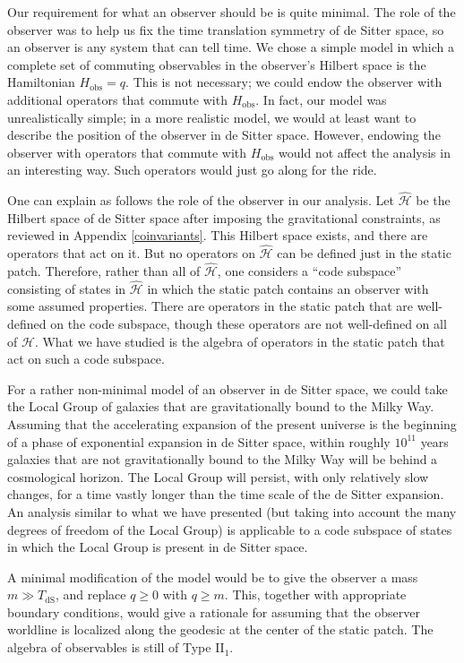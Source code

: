 \documentclass[11pt,a4paper]{article}
\def\h{\widehat}
\def\h{\widehat}
\def\H{{\mathcal H}}
\def\dS{{\mathrm{dS}}}
\def\obs{{\mathrm{obs}}}
\begin{document}
Our requirement for what an observer should  be is quite minimal. The role of the observer was to help us fix the time translation symmetry of de Sitter
space, so an observer is any system that can tell time.   We chose a simple model
in which a complete set of  commuting observables in the observer's Hilbert space is the Hamiltonian $H_\obs=q$.   This is not necessary; we could
endow the observer with additional operators that commute with $H_\obs$.  In fact,  our model was unrealistically simple;  in a more realistic
model, we would at least want to describe the position of the observer in de Sitter space.   However, endowing the observer with operators that commute with
$H_\obs$ would not affect the analysis in an interesting way.   Such operators would just go along for the ride.  

One can explain as follows the role of the observer in our analysis.   Let $\h\H$ be the Hilbert space of de Sitter space after imposing the gravitational
constraints, as reviewed in Appendix \ref{coinvariants}.   This Hilbert space exists, and there are operators that act on it.  But  no operators on
$\h\H$  can be defined just in the static patch.   Therefore, rather than all of $\h\H$, one considers a ``code subspace'' consisting of states in $\h\H$
in which the static patch contains an observer with some assumed properties.    There are operators in the static patch that are well-defined on the code subspace,
though these operators are not well-defined on all of $\H$.   What we have studied is the algebra of operators in the static patch that act on such a code subspace.

For a rather non-minimal model of an observer in de Sitter space, we could take the Local Group of galaxies that are gravitationally bound to the Milky Way.
Assuming that the accelerating expansion of the present universe is the beginning of a phase of exponential expansion in de Sitter space, within roughly
$10^{11}$ years galaxies that are not gravitationally bound to the Milky Way will be behind a cosmological horizon.   The Local Group will persist, with only
relatively slow changes, for a time vastly longer than the time scale of the de Sitter expansion.   An analysis similar to what we have presented (but taking into
account the many degrees of freedom of the Local Group) is applicable to a code subspace of states in which the Local Group is present in de Sitter space.

A minimal modification of the model would be to give the observer a mass $m\gg T_\dS$, and replace $q\geq 0$ with $q\geq m$.  This, together with appropriate
boundary conditions, would give a rationale for assuming that the observer worldline  is localized along the geodesic at the center of the static patch.   The algebra of
observables is still of Type II$_1$.
\end{document}

